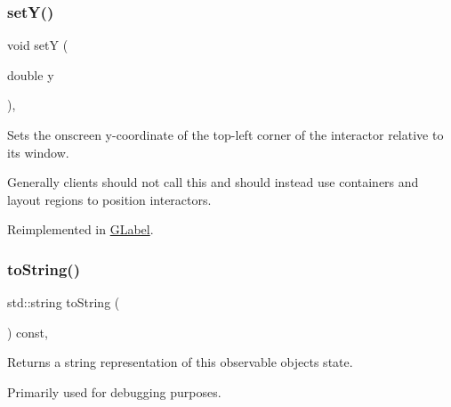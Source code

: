 \mbox{\label{classGInteractor_a7d57e2a5c35d27feb58fd498a3cf82b9}} 
\subsubsection{\texorpdfstring{set\+Y()}{setY()}}
{\footnotesize\ttfamily void setY (\begin{DoxyParamCaption}\item[{double}]{y }\end{DoxyParamCaption})\hspace{0.3cm}{\ttfamily [virtual]}, {\ttfamily [inherited]}}



Sets the onscreen y-\/coordinate of the top-\/left corner of the interactor relative to its window. 

Generally clients should not call this and should instead use containers and layout regions to position interactors. 

Reimplemented in \mbox{\hyperlink{classGLabel_a59633abb35b676c54d88ea6cd384fc55}{G\+Label}}.

\mbox{\label{classGObservable_a1fe5121d6528fdea3f243321b3fa3a49}} 
\subsubsection{\texorpdfstring{to\+String()}{toString()}}
{\footnotesize\ttfamily std\+::string to\+String (\begin{DoxyParamCaption}{ }\end{DoxyParamCaption}) const\hspace{0.3cm}{\ttfamily [virtual]}, {\ttfamily [inherited]}}



Returns a string representation of this observable object\textquotesingle{}s state. 

Primarily used for debugging purposes. 